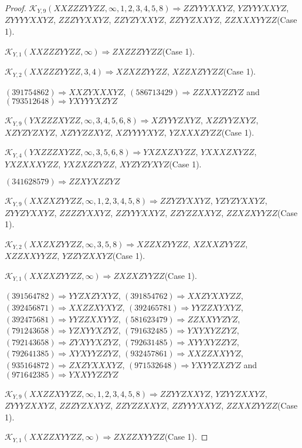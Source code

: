\documentclass[12pt]{article}
\theoremstyle{plain}
\theoremstyle{definition}
\theoremstyle{remark}
\newcommand{\fancy}[1]{\mathcal{#1}}
\def\K{\fancy{K}}
\begin{document}
\begin{proof}
	
	$\K_{Y,9}(XXZZZYYZZ,\infty,1, 2, 3, 4, 5, 8)\Rightarrow $$ZZYYYXXYZ$, $YZYYYXXYZ$, $ZYYYYXXYZ$, $ZZZYYXXYZ$, $ZZYZYXXYZ$, $ZZYYZXXYZ$, $ZZXXXYYZZ$(Case 1).
	
	$\K_{Y,1}(XXZZZYYZZ,\infty)\Rightarrow $$ZXZZZYYZZ$(Case 1).
	
	$\K_{Y,2}(XXZZZYYZZ,3, 4)\Rightarrow $$XZXZZYYZZ$, $XZZXZYYZZ$(Case 1).
	
	
	
	$(3 9 1 7 5 4 8 6 2)\Rightarrow XXZYXXXYZ$, $(5 8 6 7 1 3 4 2 9)\Rightarrow ZZXXYZZYZ$ and $(7 9 3 5 1 2 6 4 8)\Rightarrow YXYYYXZYZ$
	
	
	$\K_{Y,9}(YXZZZXYZZ,\infty,3, 4, 5, 6, 8)\Rightarrow $$XZYYYZXYZ$, $XZZYYZXYZ$, $XZYZYZXYZ$, $XZYYZZXYZ$, $XZYYYYXYZ$, $YZXXXZYZZ$(Case 1).
	
	$\K_{Y,4}(YXZZZXYZZ,\infty,3, 5, 6, 8)\Rightarrow $$YXZXZXYZZ$, $YXXXZXYZZ$, $YXZXXXYZZ$, $YXZXZZYZZ$, $XYZYZYXYZ$(Case 1).
	
	
	
	$(3 4 1 6 2 8 5 7 9)\Rightarrow ZZXYXZZYZ$
	
	
	$\K_{Y,9}(XXZXZYYZZ,\infty,1, 2, 3, 4, 5, 8)\Rightarrow $$ZZYZYXXYZ$, $YZYZYXXYZ$, $ZYYZYXXYZ$, $ZZZZYXXYZ$, $ZZYYYXXYZ$, $ZZYZZXXYZ$, $ZZXZXYYZZ$(Case 1).
	
	$\K_{Y,2}(XXZXZYYZZ,\infty,3, 5, 8)\Rightarrow $$XZZXZYYZZ$, $XZXXZYYZZ$, $XZZXXYYZZ$, $YZZYZXXYZ$(Case 1).
	
	$\K_{Y,1}(XXZXZYYZZ,\infty)\Rightarrow $$ZXZXZYYZZ$(Case 1).
	
	
	
	$(3 9 1 5 6 4 7 8 2)\Rightarrow YYZXZYXYZ$, $(3 9 1 8 5 4 7 6 2)\Rightarrow XXZYXXYZZ$, $(3 9 2 4 5 6 8 7 1)\Rightarrow XXZZXYXYZ$, $(3 9 2 4 6 5 7 8 1)\Rightarrow YYZZXYXYZ$, $(3 9 2 4 7 5 6 8 1)\Rightarrow YYZZXXYYZ$, $(5 8 1 6 2 3 4 7 9)\Rightarrow ZZXXYYZYZ$, $(7 9 1 2 4 3 6 5 8)\Rightarrow YZXYYXZYZ$, $(7 9 1 6 3 2 4 8 5)\Rightarrow YXYXYZZYZ$, $(7 9 2 1 4 3 6 5 8)\Rightarrow ZYXYYXZYZ$, $(7 9 2 6 3 1 4 8 5)\Rightarrow XYYXYZZYZ$, $(7 9 2 6 4 1 3 8 5)\Rightarrow XYXYYZZYZ$, $(9 3 2 4 5 7 8 6 1)\Rightarrow XXZZXXYYZ$, $(9 3 5 1 6 4 8 7 2)\Rightarrow ZXZYXXXYZ$, $(9 7 1 5 3 2 6 4 8)\Rightarrow YXYYZXZYZ$ and $(9 7 1 6 4 2 3 8 5)\Rightarrow YXXYYZZYZ$
	
	
	$\K_{Y,9}(XXZZXYYZZ,\infty,1, 2, 3, 4, 5, 8)\Rightarrow $$ZZYYZXXYZ$, $YZYYZXXYZ$, $ZYYYZXXYZ$, $ZZZYZXXYZ$, $ZZYZZXXYZ$, $ZZYYYXXYZ$, $ZZXXZYYZZ$(Case 1).
	
	$\K_{Y,1}(XXZZXYYZZ,\infty)\Rightarrow $$ZXZZXYYZZ$(Case 1).
	

\end{proof}
\end{document}
